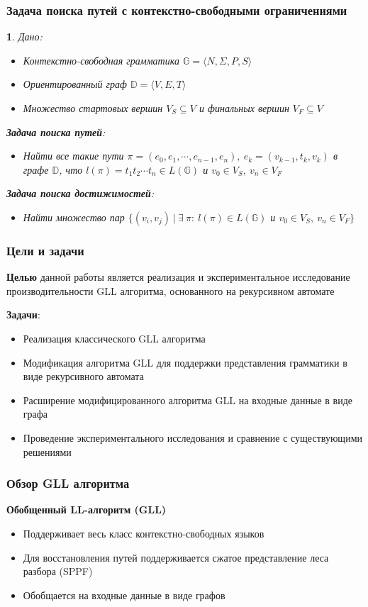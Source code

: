 \documentclass[aspectratio=169]{beamer}
\newtheorem{task}{}
\begin{document}
\begin{frame}[fragile]
  \transwipe[direction=90]
  \frametitle{Задача поиска путей с контекстно-свободными ограничениями}
   \begin{task}
  Дано:
     \begin{itemize}
    \item Контекстно-свободная грамматика $\mathbb{G}  = \langle N, \Sigma, P, S \rangle$
     \item Ориентированный граф $ \mathbb{D} = \langle V, E, T \rangle$
     \item Множество стартовых вершин $V_S \subseteq V$  и финальных вершин \mbox{$V_F \subseteq V$}
\end{itemize} 
\textbf{Задача поиска путей}:
\begin{itemize}
    \item Найти все такие пути $\pi = (e_0, e_1, \cdots, e_{n - 1}, e_n), ~ e_k = (v_{k - 1}, t_k, v_k)$ в графе $ \mathbb{D}$, что $l(\pi) = t_1t_2 \cdots t_n \in L(\mathbb{G})$ и $v_0 \in V_S, ~v_n \in V_F$
\end{itemize}
\textbf{Задача поиска достижимостей}:
\begin{itemize}
    \item Найти множество пар $\{(v_i, v_j ) ~|~ \exists ~\pi : ~l(\pi) \in L(\mathbb{G})$ и $v_0 \in V_S, ~v_n \in V_F\}$
\end{itemize}
 \end{task}
\end{frame}

\begin{frame}
  \transwipe[direction=90]
  \frametitle{Цели и задачи}
  \textbf{Целью} данной работы является реализация и экспериментальное исследование производительности GLL алгоритма, основанного на рекурсивном автомате
  
  \textbf{Задачи}:
  \begin{itemize}
    \item Реализация классического GLL алгоритма
    \item Модификация алгоритма GLL для поддержки представления грамматики в виде рекурсивного автомата
    \item Расширение модифицированного алгоритма GLL на входные данные в виде графа
    \item Проведение экспериментального исследования и сравнение с существующими решениями
\end{itemize}
\end{frame}

\begin{frame}
  \transwipe[direction=90]
  \frametitle{Обзор GLL алгоритма}
  \textbf{Обобщенный LL-алгоритм (GLL)}
\begin{itemize}
    \item Поддерживает весь класс контекстно-свободных языков
    \item Для восстановления путей поддерживается сжатое представление леса разбора (SPPF)
    \item Обобщается на входные данные в виде графов
\end{itemize}
  \end{frame}
\end{document}
